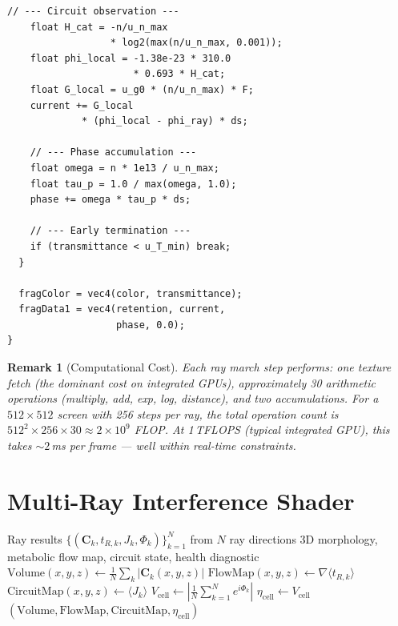 \documentclass[11pt,twocolumn,a4paper]{article}
\newtheorem{remark}[theorem]{Remark}
\newcommand{\etacell}{\eta_{\mathrm{cell}}}
\newcommand{\Vcell}{V_{\mathrm{cell}}}
\begin{document}
\begin{lstlisting}[style=glsl,caption={Triple-observation ray march
  fragment shader (GLSL pseudocode)},
  label={lst:ray-march}]
    // --- Circuit observation ---
    float H_cat = -n/u_n_max
                  * log2(max(n/u_n_max, 0.001));
    float phi_local = -1.38e-23 * 310.0
                      * 0.693 * H_cat;
    float G_local = u_g0 * (n/u_n_max) * F;
    current += G_local
             * (phi_local - phi_ray) * ds;

    // --- Phase accumulation ---
    float omega = n * 1e13 / u_n_max;
    float tau_p = 1.0 / max(omega, 1.0);
    phase += omega * tau_p * ds;

    // --- Early termination ---
    if (transmittance < u_T_min) break;
  }

  fragColor = vec4(color, transmittance);
  fragData1 = vec4(retention, current,
                   phase, 0.0);
}
\end{lstlisting}

\begin{remark}[Computational Cost]
Each ray march step performs: one texture fetch (the dominant cost on
integrated GPUs), approximately 30 arithmetic operations (multiply,
add, exp, log, distance), and two accumulations. For a $512 \times 512$
screen with 256 steps per ray, the total operation count is
$512^2 \times 256 \times 30 \approx 2 \times 10^9$ FLOP. At 1\,TFLOPS
(typical integrated GPU), this takes $\sim\!2$\,ms per frame --- well
within real-time constraints.
\end{remark}


\section{Multi-Ray Interference Shader}
\label{sec:multi-ray}

\begin{algorithm}[H]
\caption{Multi-Ray Interference for Coherence Extraction}
\label{alg:multi-ray}
\begin{algorithmic}[1]
\Require Ray results $\{(\mathbf{C}_k, t_{R,k}, J_k,
  \Phi_k)\}_{k=1}^N$ from $N$ ray directions
\Ensure 3D morphology, metabolic flow map, circuit state, health
  diagnostic
\State {}
\State $\text{Volume}(x,y,z) \gets \frac{1}{N}\sum_k
  |\mathbf{C}_k(x,y,z)|$ 
\State {}
\State $\text{FlowMap}(x,y,z) \gets \nabla \langle t_{R,k}
  \rangle$ 
\State {}
\State $\text{CircuitMap}(x,y,z) \gets \langle J_k \rangle$
\State {}
\State $\Vcell \gets \left|\frac{1}{N}\sum_{k=1}^N e^{i\Phi_k}
  \right|$ 
\State $\etacell \gets \Vcell$ 
\State \Return $(\text{Volume}, \text{FlowMap}, \text{CircuitMap},
  \etacell)$
\end{algorithmic}
\end{algorithm}
\end{document}
